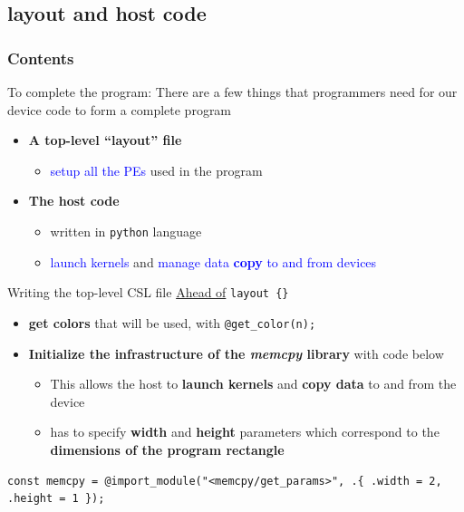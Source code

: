 \documentclass[dvipdfmx, 11pt, aspectratio=169]{beamer}   %
\begin{document}
\subsection{layout and host code}
\begin{frame}
    \frametitle{Contents}
    \tableofcontents[currentsubsection]
\end{frame}
\begin{frame}{To complete the program: }
There are a few things that programmers need for our device code to form a complete program
\begin{itemize}
    \item \textbf{A top-level “layout” file}
    \begin{itemize}
        \item \textcolor{blue}{setup all the PEs} used in the program
    \end{itemize}
    \item \textbf{The host code}
    \begin{itemize}
        \item written in \lstinline|python| language
        \item \textcolor{blue}{launch kernels} and \textcolor{blue}{manage data \textbf{copy} to and from devices}
    \end{itemize}
\end{itemize}
\end{frame}
\begin{frame}[fragile]{Writing the top-level CSL file}
\uline{Ahead of} \lstinline|layout {}|
\begin{itemize}
    \item \textbf{get colors} that will be used, with \lstinline|@get_color(n);|
    \item \textbf{Initialize the infrastructure of the \textit{memcpy} library} with code below
    \begin{itemize}
        \item This allows the host to \textbf{launch kernels} and \textbf{copy data} to and from the device
        \item has to specify \textbf{width} and \textbf{height} parameters which correspond to the \textbf{dimensions of the program rectangle}
    \end{itemize}
\end{itemize}
\begin{lstlisting}[language=CSL]
    const memcpy = @import_module("<memcpy/get_params>", .{ .width = 2, .height = 1 });
\end{lstlisting}
\end{frame}
\end{document}
